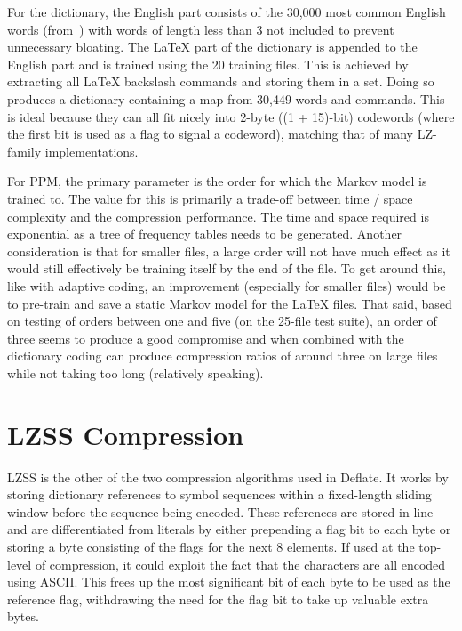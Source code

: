 \documentclass[11pt]{article}
\begin{document}
    For the dictionary, the English part consists of the 30,000 most common English words (from~\cite{dictionary-source}) with words of length less than 3 not included to prevent unnecessary bloating.
    The \LaTeX{} part of the dictionary is appended to the English part and is trained using the 20 training files.
    This is achieved by extracting all \LaTeX{} backslash commands and storing them in a set.
    Doing so produces a dictionary containing a map from 30,449 words and commands.
    This is ideal because they can all fit nicely into 2-byte ((1 + 15)-bit) codewords (where the first bit is used as a flag to signal a codeword), matching that of many LZ-family implementations.

    For PPM, the primary parameter is the order for which the Markov model is trained to.
    The value for this is primarily a trade-off between time / space complexity and the compression performance.
    The time and space required is exponential as a tree of frequency tables needs to be generated.
    Another consideration is that for smaller files, a large order will not have much effect as it would still effectively be training itself by the end of the file.
    To get around this, like with adaptive coding, an improvement (especially for smaller files) would be to pre-train and save a static Markov model for the \LaTeX{} files.
    That said, based on testing of orders between one and five (on the 25-file test suite), an order of three seems to produce a good compromise and when combined with the dictionary coding can produce compression ratios of around three on large files while not taking too long (relatively speaking).


    \section{LZSS Compression}\label{sec:lzSS-compression}
    LZSS is the other of the two compression algorithms used in Deflate.
    It works by storing dictionary references to symbol sequences within a fixed-length sliding window before the sequence being encoded.
    These references are stored in-line and are differentiated from literals by either prepending a flag bit to each byte or storing a byte consisting of the flags for the next 8 elements.
    If used at the top-level of compression, it could exploit the fact that the characters are all encoded using ASCII\@.
    This frees up the most significant bit of each byte to be used as the reference flag, withdrawing the need for the flag bit to take up valuable extra bytes.
\end{document}
